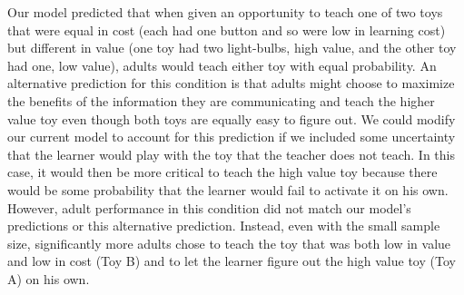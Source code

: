 \documentclass[10pt,letterpaper]{article}
\begin{document}
Our model predicted that when given an opportunity to teach one of two toys that were equal in cost (each had one button and so were low in learning cost) but different in value (one toy had two light-bulbs, high value, and the other toy had one, low value), adults would teach either toy with equal probability. An alternative prediction for this condition is that adults might choose to maximize the benefits of the information they are communicating and teach the higher value toy even though both toys are equally easy to figure out. We could modify our current model to account for this prediction if we included some uncertainty that the learner would play with the toy that the teacher does not teach. In this case, it would then be more critical to teach the high value toy because there would be some probability that the learner would fail to activate it on his own. However, adult performance in this condition did not match our model's predictions or this alternative prediction. Instead, even with the small sample size, significantly more adults chose to teach the toy that was both low in value and low in cost (Toy B) and to let the learner figure out the high value toy (Toy A) on his own. 
\end{document}

